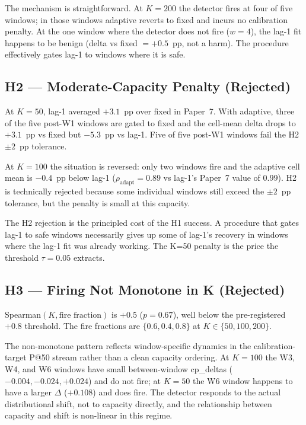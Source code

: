 The mechanism is straightforward. At $K = 200$ the detector fires
at four of five windows; in those windows \textsf{adaptive} reverts
to \textsf{fixed} and incurs no calibration penalty. At the one
window where the detector does not fire ($w = 4$), the lag-1 fit
happens to be benign (delta vs fixed $= +0.5$~pp, not a harm). The
procedure effectively gates lag-1 to windows where it is safe.

\subsection{H2 --- Moderate-Capacity Penalty (Rejected)}

At $K = 50$, lag-1 averaged $+3.1$~pp over fixed in Paper~7. With
\textsf{adaptive}, three of the five post-W1 windows are gated to
\textsf{fixed} and the cell-mean delta drops to $+3.1$~pp vs fixed
but $-5.3$~pp vs lag-1. Five of five post-W1 windows fail the H2
$\pm 2$~pp tolerance.

At $K = 100$ the situation is reversed: only two windows fire and
the adaptive cell mean is $-0.4$~pp below lag-1 ($\rho_{\text{adapt}}
= 0.89$ vs lag-1's Paper~7 value of $0.99$). H2 is technically
rejected because some individual windows still exceed the $\pm
2$~pp tolerance, but the penalty is small at this capacity.

The H2 rejection is the principled cost of the H1 success. A
procedure that gates lag-1 to safe windows necessarily gives up some
of lag-1's recovery in windows where the lag-1 fit was already
working. The K=50 penalty is the price the threshold $\tau = 0.05$
extracts.

\subsection{H3 --- Firing Not Monotone in K (Rejected)}

Spearman$(K, \text{fire fraction})$ is $+0.5$ ($p = 0.67$), well
below the pre-registered $+0.8$ threshold. The fire fractions are
$\{0.6, 0.4, 0.8\}$ at $K \in \{50, 100, 200\}$.

The non-monotone pattern reflects window-specific dynamics in the
calibration-target P@50 stream rather than a clean capacity
ordering. At $K = 100$ the W3, W4, and W6 windows have small
between-window cp\_deltas ($-0.004, -0.024, +0.024$) and do not fire;
at $K = 50$ the W6 window happens to have a larger $\Delta$
($+0.108$) and does fire. The detector responds to the actual
distributional shift, not to capacity directly, and the relationship
between capacity and shift is non-linear in this regime.

